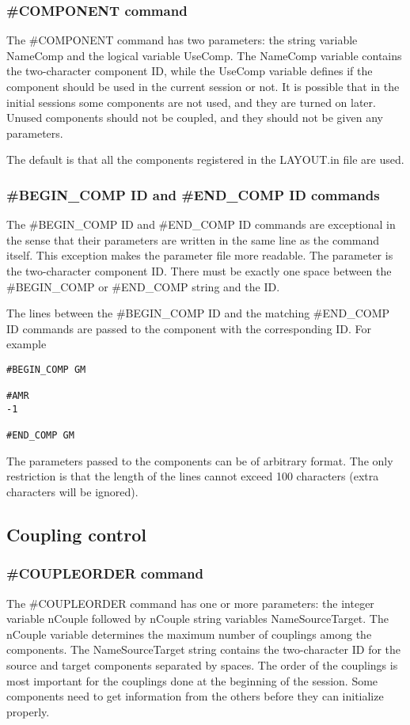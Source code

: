 \subsubsection{\#COMPONENT command}

The \#COMPONENT command has two parameters: the string variable 
NameComp and the logical variable UseComp. The NameComp variable
contains the two-character component ID, while the UseComp
variable defines if the component should be used in the current
session or not. It is possible that in the initial sessions
some components are not used, and they are turned on later.
Unused components should not be coupled, and they should not
be given any parameters.

The default is that all the components registered in the LAYOUT.in
file are used.

\subsubsection{\#BEGIN\_COMP ID and \#END\_COMP ID commands}

The \#BEGIN\_COMP ID and \#END\_COMP ID commands are exceptional in the sense 
that their parameters are written in the same line as the command itself.
This exception makes the parameter file more readable. The parameter
is the two-character component ID. There must be exactly one space
between the \#BEGIN\_COMP or \#END\_COMP string and the ID.

The lines between the \#BEGIN\_COMP ID and the matching 
\#END\_COMP ID commands are passed to the component with the
corresponding ID. For example 
\begin{verbatim}
#BEGIN_COMP GM

#AMR
-1

#END_COMP GM
\end{verbatim}
The parameters passed to the components can be of arbitrary format.
The only restriction is that the length of the lines cannot exceed
100 characters (extra characters will be ignored).

\subsection{Coupling control}

\subsubsection{\#COUPLEORDER command}

The \#COUPLEORDER command has one or more parameters: the integer
variable nCouple followed by nCouple string variables NameSourceTarget.
The nCouple variable determines the maximum number of couplings
among the components. The NameSourceTarget string contains the 
two-character ID for the source and target components separated by
spaces. The order of the couplings is most important for the
couplings done at the beginning of the session. Some components need
to get information from the others before they can initialize properly.

